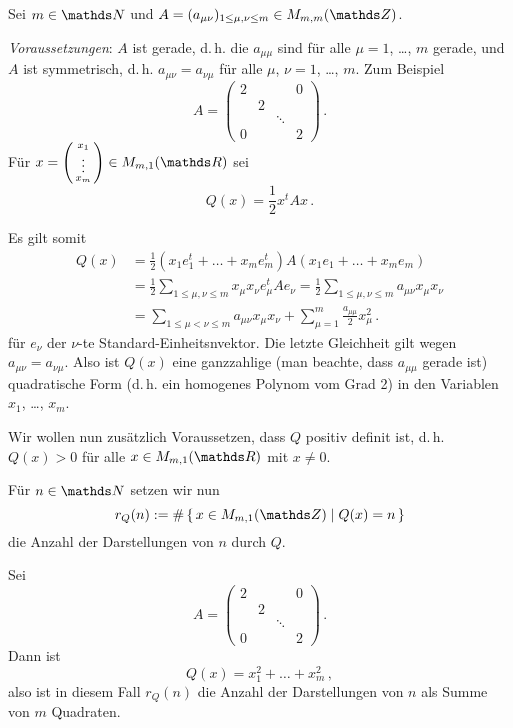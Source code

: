 Sei $m\in\NN$ und $A = ( a_{\mu\nu})_{1\leq\mu,\nu\leq m} \in M_{m,m}(\ZZ)$.

\emph{Voraussetzungen}: $A$ ist gerade, d.\,h. die $a_{\mu\mu}$ sind für alle $\mu = 1$, \ldots, $m$ gerade, und $A$ ist symmetrisch, d.\,h. $a_{\mu\nu} = a_{\nu\mu}$ für alle $\mu$, $\nu = 1$, \ldots, $m$.
Zum Beispiel
\[
	A =
	\begin{pmatrix}
	2 & & & 0 \\
	& 2 \\
	& & \ddots \\
	0 & & & 2
	\end{pmatrix}
	\,.
\]
Für $x = \left(\begin{smallmatrix}x_1 \\ \vdots \\ x_m\end{smallmatrix}\right) \in M_{m,1}(\RR)$ sei
\[
	Q(x)
	= \frac{1}{2} x^t A x
	\,.
\]

Es gilt somit
\begin{align*}
	Q(x)
	&= \frac{1}{2} (x_1e_1^t + \ldots + x_me_m^t) A (x_1e_1 + \ldots + x_me_m) \\
	&= \frac{1}{2} \sum_{1\leq\mu,\nu\leq m} x_\mu x_\nu e_\mu^t A e_\nu
	= \frac{1}{2} \sum_{1\leq\mu,\nu\leq m} a_{\mu\nu}x_\mu x_\nu \\
	&= \sum_{1\leq \mu < \nu \leq m} a_{\mu\nu}x_\mu x_\nu + \sum_{\mu=1}^m \frac{a_{\mu\mu}}{2} x_\mu^2
	\,.
\end{align*}
für $e_\nu$ der $\nu$-te Standard-Einheitsnvektor.
Die letzte Gleichheit gilt wegen $a_{\mu\nu} = a_{\nu\mu}$.
Also ist $Q(x)$ eine ganzzahlige (man beachte, dass $a_{\mu\mu}$ gerade ist) quadratische Form (d.\,h. ein homogenes Polynom vom Grad 2) in den Variablen $x_1$, \ldots, $x_m$.

Wir wollen nun zusätzlich Voraussetzen, dass $Q$ positiv definit ist, d.\,h. $Q(x) > 0$ für alle $x \in M_{m,1}(\RR)$ mit $x\not=0$.

Für $n\in\NN$ setzen wir nun
\[
	r_Q(n)
	:= \# \Set{x \in M_{m,1}(\ZZ) \mid Q(x) = n}
\]
die Anzahl der Darstellungen von $n$ durch $Q$.
\begin{bsp}
Sei
\[
	A =
	\begin{pmatrix}
	2 & & & 0 \\
	& 2 \\
	& & \ddots \\
	0 & & & 2
	\end{pmatrix}
	\,.
\]
Dann ist
\[
	Q(x) = x_1^2 + \ldots + x_m^2
	\,,
\]
also ist in diesem Fall $r_Q(n)$ die Anzahl der Darstellungen von $n$ als Summe von $m$ Quadraten.
\end{bsp}

